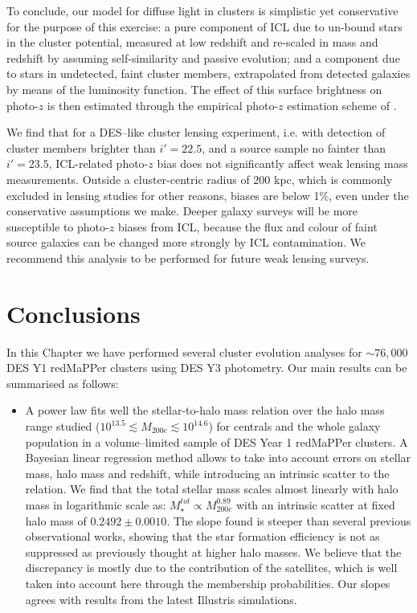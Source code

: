 {To conclude, our model for diffuse light in clusters is simplistic yet conservative for the purpose of this exercise: a pure component of ICL due to un-bound stars in the cluster potential, measured at low redshift \citep{icl} and re-scaled in mass and redshift by assuming self-similarity and passive evolution; and a component due to stars in undetected, faint cluster members, extrapolated from detected galaxies by means of the luminosity function. The effect of this surface brightness on photo-$z$ is then estimated through the empirical photo-$z$ estimation scheme of \citet{2016arXiv161001160G}.

We find that for a DES--like cluster lensing experiment, i.e. with detection of cluster members brighter than $i'=22.5$, and a source sample no fainter than $i'=23.5$, ICL-related photo-$z$ bias does not significantly affect weak lensing mass measurements. Outside a cluster-centric radius of $200$ kpc, which is commonly excluded in lensing studies for other reasons, biases are below 1\%, even under the conservative assumptions we make. Deeper galaxy surveys will be more susceptible to photo-$z$ biases from ICL, because the flux and colour of faint source galaxies can be changed more strongly by ICL contamination. We recommend this analysis to be performed for future weak lensing surveys.



\section{Conclusions}\label{sec:conclusion}

In this Chapter we have performed several cluster evolution analyses for $\sim 76,000$ DES Y1 redMaPPer clusters using DES Y3 photometry. Our main results can be summarised as follows:

\begin{itemize}

\item A power law fits well the stellar-to-halo mass relation over the halo mass range studied ($10^{13.5} \lesssim M_{200c}\lesssim 10^{14.6}$) for centrals and the whole galaxy population in a volume--limited sample of DES Year 1 redMaPPer clusters. A Bayesian linear regression method allows to take into account errors on stellar mass, halo mass and redshift, while introducing an intrinsic scatter to the relation. We find that the total stellar mass scales almost linearly with halo mass in logarithmic scale as: $M_\star^{tot}\propto M_{200c}^{0.89}$ with an intrinsic scatter at fixed halo mass of $0.2492\pm 0.0010$. The slope found is steeper than several previous observational works, showing that the star formation efficiency is not as suppressed as previously thought at higher halo masses. We believe that the discrepancy is mostly due to the contribution of the satellites, which is well taken into account here through the membership probabilities. Our slopes agrees with results from the latest Illustris simulations.


\end{itemize}}
